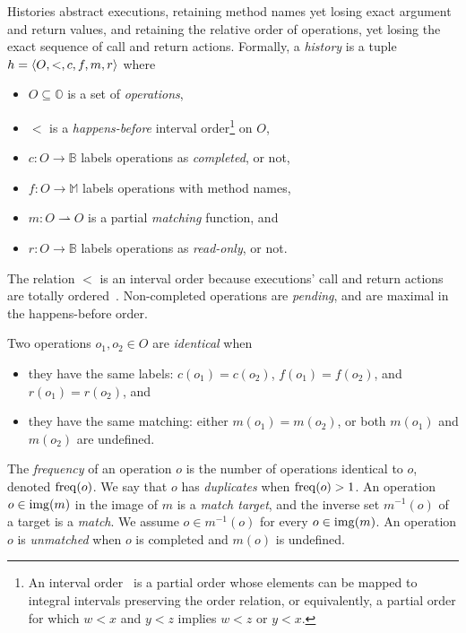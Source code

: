 Histories abstract executions, retaining method
names yet losing exact argument and return values, and retaining the relative
order of operations, yet losing the exact sequence of call and return actions.
Formally, a \emph{history} is a tuple $h = {\left\langle{O,<,c,f,m,r}\right\rangle}$ where
\begin{itemize}

  \item $O \subseteq \mathbb{O}$ is a set of \emph{operations},

  \item $<$ is a \emph{happens-before} interval order\footnote{An interval
  order~\cite{books/Fishburn85} is a partial order whose elements can be mapped
  to integral intervals preserving the order relation, or equivalently, a
  partial order for which $w < x$ and $y < z$ implies $w < z$ or $y < x$.} on
  $O$,

  \item $c: O \to \mathbb{B}$ labels operations as \emph{completed}, or not,

  \item $f: O \to \mathbb{M}$ labels operations with method names,

  \item $m: O \rightharpoonup O$ is a partial \emph{matching} function, and

  \item $r: O \to \mathbb{B}$ labels operations as \emph{read-only}, or not.

\end{itemize}
The relation $<$ is an interval order because executions’ call and return
actions are totally ordered~\cite{conf/popl/BouajjaniEEH15}. Non-completed
operations are \emph{pending}, and are maximal in the happens-before order.

Two operations $o_1, o_2 \in O$ are \emph{identical} when
\begin{itemize}

  \item they have the same labels: $c(o_1) = c(o_2)$, $f(o_1)= f(o_2)$, and
  $r(o_1) = r(o_2)$, and

  \item they have the same matching: either $m(o_1) = m(o_2)$, or both $m(o_1)$
  and $m(o_2)$ are undefined.

\end{itemize}
The \emph{frequency} of an operation $o$ is the number of operations identical
to $o$, denoted $\operatorname{freq}(o)$. We say that $o$ has \emph{duplicates} when
$\operatorname{freq}(o) > 1$. An operation $o \in \operatorname{img}(m)$ in the image of $m$ is a
\emph{match target}, and the inverse set $m^{-1}(o)$ of a target is a
\emph{match}. We assume $o \in m^{-1}(o)$ for every $o \in \operatorname{img}(m)$.
An operation $o$ is \emph{unmatched} when $o$ is completed and $m(o)$ is undefined.

